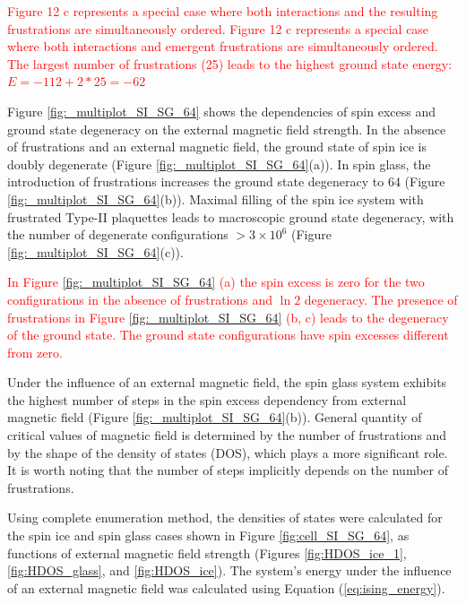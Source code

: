 \documentclass[preprint,12pt]{elsarticle}
\begin{document}
	\textcolor{red}{Figure 12 c represents a special case where both interactions and the resulting frustrations are simultaneously ordered. Figure 12 c represents a special case where both interactions and emergent frustrations are simultaneously ordered. The largest number of frustrations (25) leads to the highest ground state energy: $E = -112 + 2*25 = -62$}
	
	Figure \ref{fig:_multiplot_SI_SG_64} shows the dependencies of spin excess and ground state degeneracy on the external magnetic field strength.
	In the absence of frustrations and an external magnetic field, the ground state of spin ice is doubly degenerate (Figure \ref{fig:_multiplot_SI_SG_64}(a)).
	In spin glass, the introduction of frustrations increases the ground state degeneracy to 64 (Figure \ref{fig:_multiplot_SI_SG_64}(b)).
	Maximal filling of the spin ice system with frustrated Type-II plaquettes leads to macroscopic ground state degeneracy, with the number of degenerate configurations $> 3\times10^{6}$ (Figure \ref{fig:_multiplot_SI_SG_64}(c)).
	
	\textcolor{red}{In Figure \ref{fig:_multiplot_SI_SG_64} (a) the spin excess is zero for the two configurations in the absence of frustrations and $\ln 2$ degeneracy. The presence of frustrations in Figure \ref{fig:_multiplot_SI_SG_64} (b, c) leads to the degeneracy of the ground state. The ground state configurations have spin excesses different from zero.}
	
	Under the influence of an external magnetic field, the spin glass system exhibits the highest number of steps in the spin excess dependency from external magnetic field (Figure \ref{fig:_multiplot_SI_SG_64}(b)).
	General quantity of critical values of magnetic field is determined by the number of frustrations and by the shape of the density of states (DOS), which plays a more significant role.
	It is worth noting that the number of steps implicitly depends on the number of frustrations.
	
	Using complete enumeration method, the densities of states were calculated for the spin ice and spin glass cases shown in Figure \ref{fig:cell_SI_SG_64}, as functions of external magnetic field strength (Figures \ref{fig:HDOS_ice_1}, \ref{fig:HDOS_glass}, and \ref{fig:HDOS_ice}).
	The system's energy under the influence of an external magnetic field was calculated using Equation (\ref{eq:ising_energy}).
	
\end{document}
